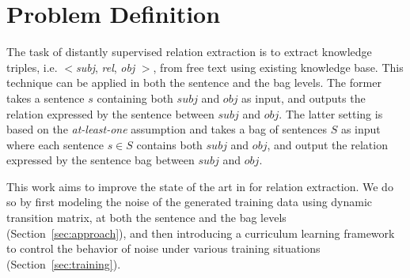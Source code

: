 \section{Problem Definition}
The task of distantly supervised relation extraction is to extract knowledge triples, i.e. $<$\emph{subj},  \emph{rel},
\emph{obj} $>$, from free text using existing knowledge base. This technique can be applied in both the sentence and the bag
levels.  The former  takes a sentence $s$ containing both $subj$ and $obj$ as input, and outputs the relation expressed
by the sentence between $subj$ and $obj$. The latter setting is based on the \textit{at-least-one} assumption
 and takes a bag of sentences $S$ as input where each sentence
$s\in S$ contains both $subj$ and
$obj$, and output  the relation expressed by the sentence bag between $subj$ and $obj$.


This work aims to improve the state of the art in \DS for relation extraction. 
We do so by first modeling the noise of the \DS generated training data using dynamic transition matrix,  at both the sentence and the bag levels (Section~\ref{sec:approach}),  and then introducing a curriculum learning framework  to control the behavior of noise  under various training situations (Section~\ref{sec:training}).






